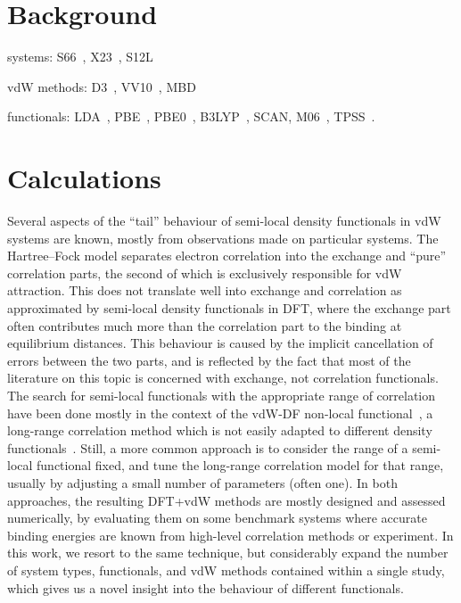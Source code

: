 \section{Background}

systems: S66~\cite{RezacJCTC11}, X23~\cite{ReillyJCP13}, S12L~\cite{RisthausJCTC13}

vdW methods: D3~\cite{GrimmeJCP10}, VV10~\cite{VydrovJCP10a}, MBD

functionals: LDA~\cite{DiracMPCPS30,PerdewPRB92}, PBE~\cite{PerdewPRL96}, PBE0~\cite{AdamoJCP99}, B3LYP~\cite{BeckeJCP93}, SCAN, M06~\cite{ZhaoTCA08}, TPSS~\cite{TaoPRL03}.

\section{Calculations}

Several aspects of the ``tail'' behaviour of semi-local density functionals in vdW systems are known, mostly from observations made on particular systems.
The Hartree--Fock model separates electron correlation into the exchange and ``pure'' correlation parts, the second of which is exclusively responsible for vdW attraction.
This does not translate well into exchange and correlation as approximated by semi-local density functionals in DFT, where the exchange part often contributes much more than the correlation part to the binding at equilibrium distances.
This behaviour is caused by the implicit cancellation of errors between the two parts, and is reflected by the fact that most of the literature on this topic is concerned with exchange, not correlation functionals.
The search for semi-local functionals with the appropriate range of correlation have been done mostly in the context of the vdW-DF non-local functional~\cite{CooperPRB10,PernalPRL09,KlimesJPCM10,KlimesPRB11,HamadaPRB14,WellendorffPRB12,BerlandPRB14}, a long-range correlation method which is not easily adapted to different density functionals~\cite{DionPRL04,LeePRB10}.
Still, a more common approach is to consider the range of a semi-local functional fixed, and tune the long-range correlation model for that range, usually by adjusting a small number of parameters (often one).
In both approaches, the resulting DFT+vdW methods are mostly designed and assessed numerically, by evaluating them on some benchmark systems where accurate binding energies are known from high-level correlation methods or experiment.
In this work, we resort to the same technique, but considerably expand the number of system types, functionals, and vdW methods contained within a single study, which gives us a novel insight into the behaviour of different functionals.

